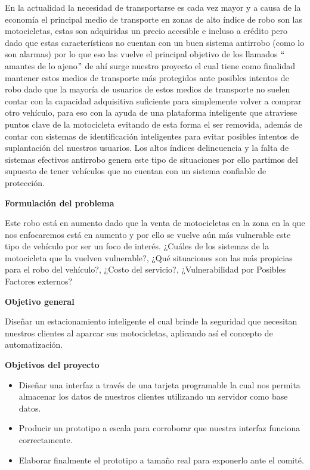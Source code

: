 \documentclass[12pt]{article}
\begin{document}
En la actualidad la necesidad de transportarse es cada vez mayor y a causa de la economía el principal medio de transporte en zonas de alto índice de robo son las motocicletas, estas son adquiridas un precio accesible e incluso a crédito pero dado que estas características no cuentan con un buen sistema antirrobo (como lo son alarmas) por lo que eso las vuelve el principal objetivo de los llamados $``$amantes de lo ajeno$"$  de ahí surge nuestro proyecto el cual tiene como finalidad mantener estos medios de transporte más protegidos ante posibles intentos de robo dado que la mayoría de usuarios de estos medios de transporte no suelen contar con la capacidad adquisitiva suficiente para simplemente volver a comprar otro vehículo, para eso con la ayuda de una plataforma inteligente que atraviese puntos clave de la motocicleta evitando de esta forma el ser removida, además de contar con sistemas de identificación inteligentes para evitar posibles intentos de suplantación del nuestros usuarios. Los altos índices delincuencia y la falta de sistemas efectivos antirrobo genera este tipo de situaciones por ello partimos del supuesto de tener vehículos que no cuentan con un sistema confiable de protección.\par

\textbf{Formulación del problema}\par

Este robo está en aumento dado que la venta de motocicletas en la zona en la que nos enfocaremos está en aumento y por ello se vuelve aún más vulnerable este tipo de vehículo por ser un foco de interés. ¿Cuáles de los sistemas de la motocicleta que la vuelven vulnerable?, ¿Qué situaciones son las más propicias para el robo del vehículo?, ¿Costo del servicio?, ¿Vulnerabilidad por Posibles Factores externos?\par

\textbf{Objetivo general }\par

Diseñar un estacionamiento inteligente el cual brinde la seguridad que necesitan nuestros clientes al aparcar sus motocicletas, aplicando así el concepto de automatización. \par

\textbf{Objetivos del proyecto}\par

\begin{itemize}
	\item Diseñar una interfaz a través de una tarjeta programable la cual nos permita almacenar los datos de nuestros clientes utilizando un servidor como base datos. \par

	\item Producir un prototipo a escala para corroborar que nuestra interfaz funciona correctamente. \par

	\item Elaborar finalmente el prototipo a tamaño real para exponerlo ante el comité. 
\end{itemize}\par
\end{document}
